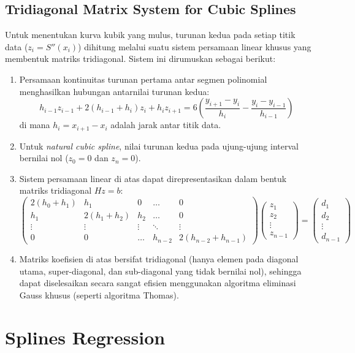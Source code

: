 \documentclass[12pt,a4paper]{report}
\begin{document}
\subsection{Tridiagonal Matrix System for Cubic Splines}
Untuk menentukan kurva kubik yang mulus, turunan kedua pada setiap titik data ($z_i = S''(x_i)$) dihitung melalui suatu sistem persamaan linear khusus yang membentuk matriks tridiagonal. Sistem ini dirumuskan sebagai berikut:
\begin{enumerate}
    \item Persamaan kontinuitas turunan pertama antar segmen polinomial menghasilkan hubungan antarnilai turunan kedua:
    \[
    h_{i-1} z_{i-1} + 2(h_{i-1} + h_i) z_i + h_i z_{i+1} = 6 \left( \frac{y_{i+1} - y_i}{h_i} - \frac{y_i - y_{i-1}}{h_{i-1}} \right)
    \]
    di mana $h_i = x_{i+1} - x_i$ adalah jarak antar titik data.
    \item Untuk \textit{natural cubic spline}, nilai turunan kedua pada ujung-ujung interval bernilai nol ($z_0 = 0$ dan $z_n = 0$).
    \item Sistem persamaan linear di atas dapat direpresentasikan dalam bentuk matriks tridiagonal $Hz = b$:
    \[
    \begin{pmatrix}
    2(h_0 + h_1) & h_1 & 0 & \dots & 0 \\
    h_1 & 2(h_1 + h_2) & h_2 & \dots & 0 \\
    \vdots & \vdots & \vdots & \ddots & \vdots \\
    0 & 0 & \dots & h_{n-2} & 2(h_{n-2} + h_{n-1})
    \end{pmatrix}
    \begin{pmatrix}
    z_1 \\ z_2 \\ \vdots \\ z_{n-1}
    \end{pmatrix}
    =
    \begin{pmatrix}
    d_1 \\ d_2 \\ \vdots \\ d_{n-1}
    \end{pmatrix}
    \]
    \item Matriks koefisien di atas bersifat tridiagonal (hanya elemen pada diagonal utama, super-diagonal, dan sub-diagonal yang tidak bernilai nol), sehingga dapat diselesaikan secara sangat efisien menggunakan algoritma eliminasi Gauss khusus (seperti algoritma Thomas).
\end{enumerate}
\section{Splines Regression}
\end{document}
